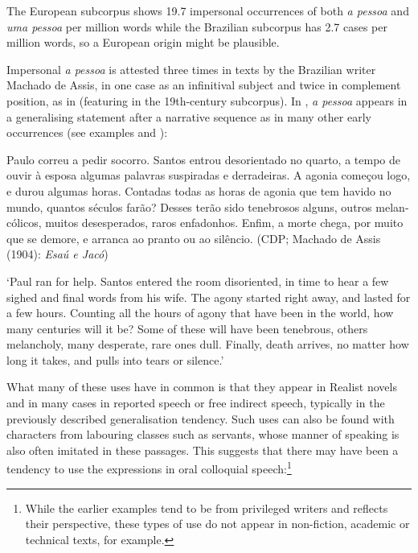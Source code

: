 \documentclass[output=paper]{langscibook}
\begin{document}
The European subcorpus shows 19.7 impersonal occurrences of both \textit{a pessoa} and \textit{uma pessoa} per million words while the Brazilian subcorpus has 2.7 cases per million words, so a European origin might be plausible.



{Impersonal} {\textit{a pessoa}} {is attested three times in texts by the Brazilian writer Machado de Assis, in one case as an infinitival subject and twice in complement position, as in  (featuring in the 19th{}-century subcorpus). In ,} {\textit{a pessoa}} {appears in a generalising statement after a narrative sequence as in many other early occurrences (see examples  and ):}



\eanoraggedright\label{ex:amaral:27}
\begin{sloppypar}
\begin{otherlanguage}{portuguese}
Paulo correu a pedir socorro. Santos entrou desorientado no quarto, a tempo de ouvir à esposa algumas palavras suspiradas e derradeiras. A agonia começou logo, e durou algumas horas. Contadas todas as horas de agonia que tem havido no mundo, quantos séculos farão? Desses terão sido tenebrosos alguns, outros melancólicos, muitos desesperados, raros enfadonhos. Enfim, a morte chega, por muito que se demore, e arranca  ao pranto ou ao silêncio. {(CDP; Machado de Assis (1904):} {\textit{Esaú e Jacó}})
\end{otherlanguage}
\end{sloppypar}
\glt ‘Paul ran for help. Santos entered the room disoriented, in time to hear a few sighed and final words from his wife. The agony started right away, and lasted for a few hours. Counting all the hours of agony that have been in the world, how many centuries will it be? Some of these will have been tenebrous, others melancholy, many desperate, rare ones dull. Finally, death arrives, no matter how long it takes, and pulls  into tears or silence.’
\z 


What many of these uses have in common is that they appear in Realist novels and in many cases in reported speech or free indirect speech, typically in the previously described generalisation tendency. Such uses can also be found with characters from labouring classes such as servants, whose manner of speaking is also often imitated in these passages. This suggests that there may have been a tendency to use the expressions in oral colloquial speech:\footnote{While the earlier examples tend to be from privileged writers and reflects their perspective, these types of use do not appear in non-fiction, academic or technical texts, for example.}
\end{document}
